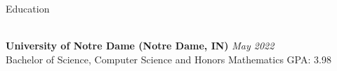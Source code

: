 \documentclass[10pt]{resume} %
\begin{document}

\begin{rSection}{Education}

\\{\bf University of Notre Dame (Notre Dame, IN) } \hfill { \em May 2022 } 
\\ Bachelor of Science, Computer Science and Honors Mathematics\hfill { GPA: 3.98 }


\end{rSection}



\end{document}
